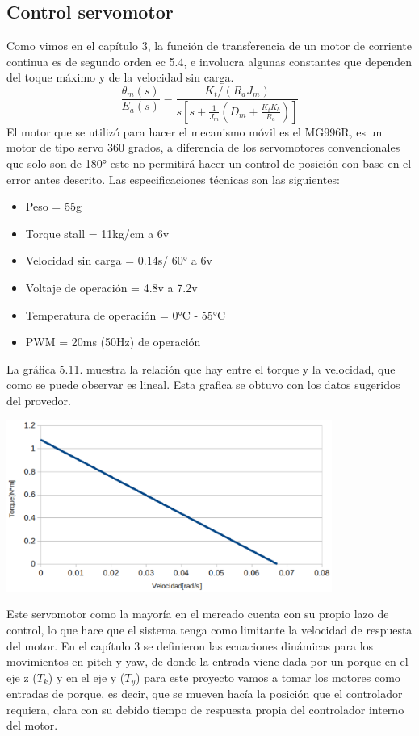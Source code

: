 \subsection{Control servomotor}
Como vimos en el capítulo 3, la función de transferencia de un motor de corriente continua es de segundo orden ec 5.4, e involucra algunas constantes que dependen del toque máximo y
de la velocidad sin carga.
\begin{equation}
	\frac{\theta_m (s)}{E_a(s)} = \frac{K_t / (R_aJ_m)}{s \left[ s + \frac{1}{J_m} \left( D_m + \frac{K_tK_b}{R_a} \right) \right]}
\end{equation}
El motor que se utilizó para hacer el mecanismo móvil es el MG996R, es un motor de tipo servo 360 grados, a diferencia de los servomotores
convencionales que solo son de 180° este no permitirá hacer un control de posición con base en el error antes descrito. Las especificaciones técnicas son las siguientes:
\begin{itemize}
	\item Peso = 55g
	\item Torque stall = 11kg/cm a 6v
	\item Velocidad sin carga = 0.14s/ 60° a 6v
	\item Voltaje de operación = 4.8v a 7.2v
	\item Temperatura de operación = 0°C - 55°C
	\item PWM = 20ms (50Hz) de operación
\end{itemize}
La gráfica 5.11. muestra la relación que hay entre el torque y la velocidad, que como se puede observar es lineal. Esta grafica se obtuvo con los datos sugeridos del
provedor.
\begin{center}
	\includegraphics[width=0.8\textwidth]{Contenido/Cuerpo/Capitulo5/Fig19.eps}
	\label{Fig4}
\end{center}
Este servomotor como la mayoría en el mercado cuenta con su propio lazo de control, lo que hace que el sistema tenga como limitante la velocidad de respuesta del motor.
En el capítulo 3 se definieron las ecuaciones dinámicas para los movimientos en pitch y yaw, de donde la entrada viene dada por un porque en el eje z ($T_k$) y en el eje y ($T_y$)
para este proyecto vamos a tomar los motores como entradas de porque, es decir, que se mueven hacía la posición que el controlador requiera, clara con su debido tiempo de
respuesta propia del controlador interno del motor.



